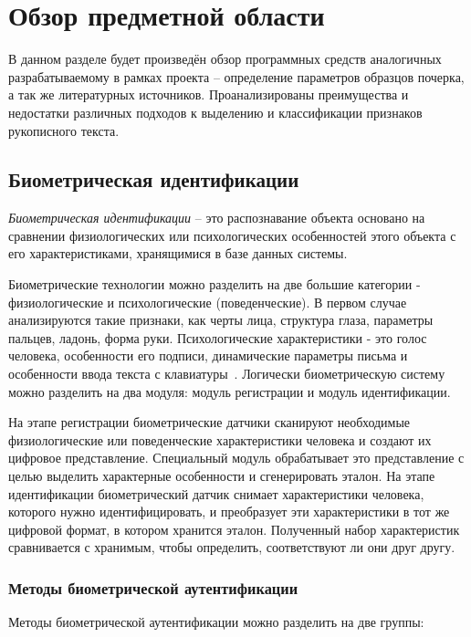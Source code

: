 \section{Обзор предметной области}
\label{sec:domain:intro}

В данном разделе будет произведён обзор программных средств аналогичных разрабатываемому в рамках проекта – определение параметров образцов почерка, а так же литературных источников. Проанализированы преимущества и недостатки различных подходов к выделению и классификации признаков рукописного текста.

\subsection{Биометрическая идентификации}
\label{sub:domain:bioauthentication}
\emph{Биометрическая идентификации} -- это распознавание объекта основано на сравнении физиологических
или психологических особенностей этого объекта с его характеристиками, хранящимися в
базе данных системы.

Биометрические технологии можно разделить на две большие категории - физиологические и психологические (поведенческие). В первом случае анализируются такие признаки, как черты лица, структура глаза, параметры пальцев, ладонь, форма руки. Психологические характеристики - это голос человека, особенности его подписи, динамические параметры письма и особенности ввода текста с клавиатуры~\cite{bioauth_dinamic_moves}.
Логически биометрическую систему можно разделить на два модуля: модуль регистрации и модуль идентификации.

На этапе регистрации биометрические датчики сканируют необходимые физиологические или поведенческие характеристики человека и создают их цифровое представление. Специальный модуль обрабатывает это представление с целью выделить характерные особенности и сгенерировать эталон. На этапе идентификации биометрический датчик снимает характеристики человека, которого нужно идентифицировать, и преобразует эти характеристики в тот же цифровой формат, в котором хранится эталон. Полученный набор характеристик сравнивается с хранимым, чтобы определить, соответствуют ли они друг другу.

\subsubsection{Методы биометрической аутентификации}
Методы биометрической аутентификации можно разделить на две группы:

